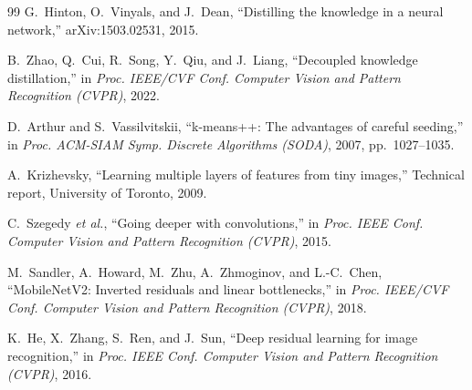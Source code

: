 \begin{thebibliography}{99}
G.~Hinton, O.~Vinyals, and J.~Dean, ``Distilling the knowledge in a neural network,'' arXiv:1503.02531, 2015.

B.~Zhao, Q.~Cui, R.~Song, Y.~Qiu, and J.~Liang, ``Decoupled knowledge distillation,'' in \emph{Proc. IEEE/CVF Conf. Computer Vision and Pattern Recognition (CVPR)}, 2022.

D.~Arthur and S.~Vassilvitskii, ``k-means++: The advantages of careful seeding,'' in \emph{Proc. ACM-SIAM Symp. Discrete Algorithms (SODA)}, 2007, pp.~1027--1035.

A.~Krizhevsky, ``Learning multiple layers of features from tiny images,'' Technical report, University of Toronto, 2009.

C.~Szegedy \emph{et al.}, ``Going deeper with convolutions,'' in \emph{Proc. IEEE Conf. Computer Vision and Pattern Recognition (CVPR)}, 2015.

M.~Sandler, A.~Howard, M.~Zhu, A.~Zhmoginov, and L.-C.~Chen, ``MobileNetV2: Inverted residuals and linear bottlenecks,'' in \emph{Proc. IEEE/CVF Conf. Computer Vision and Pattern Recognition (CVPR)}, 2018.

K.~He, X.~Zhang, S.~Ren, and J.~Sun, ``Deep residual learning for image recognition,'' in \emph{Proc. IEEE Conf. Computer Vision and Pattern Recognition (CVPR)}, 2016.

\end{thebibliography}
